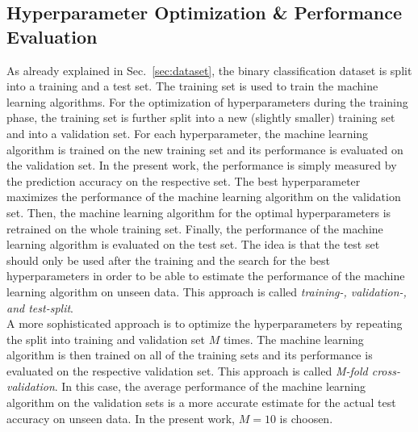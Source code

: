 \subsection{Hyperparameter Optimization \& Performance Evaluation}
As already explained in Sec.~\ref{sec:dataset}, the binary classification dataset is split into a training and a test set. The training set is used to train the machine learning algorithms. For the optimization of hyperparameters during the training phase, the training set is further split into a new (slightly smaller) training set and into a validation set. For each hyperparameter, the machine learning algorithm is trained on the new training set and its performance is evaluated on the validation set. In the present work, the performance is simply measured by the prediction accuracy on the respective set. The best hyperparameter maximizes the performance of the machine learning algorithm on the validation set. Then, the machine learning algorithm for the optimal hyperparameters is retrained on the whole training set. Finally, the performance of the machine learning algorithm is evaluated on the test set. The idea is that the test set should only be used after the training and the search for the best hyperparameters in order to be able to estimate the performance of the machine learning algorithm on unseen data. This approach is called \textit{training-, validation-, and test-split}.\\

A more sophisticated approach is to optimize the hyperparameters by repeating the split into training and validation set $M$ times. The machine learning algorithm is then trained on all of the training sets and its performance is evaluated on the respective validation set. This approach is called \textit{M-fold cross-validation}. In this case, the average performance of the machine learning algorithm on the validation sets is a more accurate estimate for the actual test accuracy on unseen data. In the present work, $M=10$ is choosen.